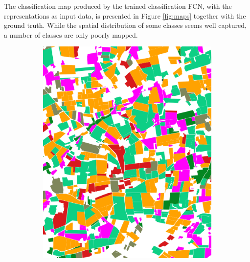 \documentclass[journal,article,submit,pdftex,moreauthors]{Definitions/mdpi}
\begin{document}
The classification map produced by the trained classification FCN, with the representations as input data, is presented in Figure \ref{fig:maps} together with the ground truth.
While the spatial distribution of some classes seems well captured, a number of classes are only poorly mapped.
\begin{figure}[H]
	\centering
	\begin{subfigure}[t]{0.3\linewidth}
		\centering
		\includegraphics[height=\linewidth,width=0.95\linewidth]{figures/frh04_clip.png}
	\caption{}
	\label{fig:frh04_labels}
	\end{subfigure}\hspace{1cm}

\end{figure}
\end{document}
